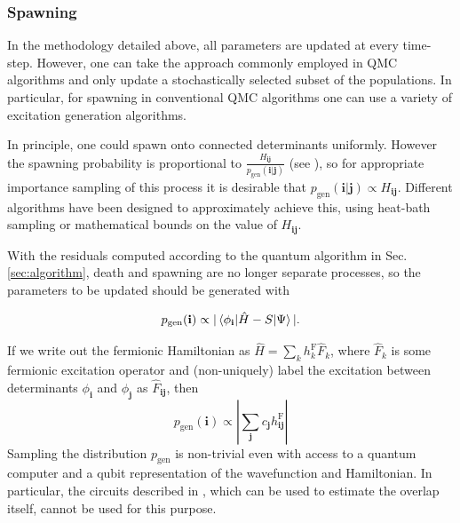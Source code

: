 \documentclass[%
 reprint,
 amsmath,amssymb,
 aps,
]{revtex4-2}
\begin{document}
{\subsubsection{Spawning}\label{sec:spawn}
In the methodology detailed above, all parameters are updated at every time-step. However, one can take the approach commonly employed in QMC algorithms and only update a stochastically selected subset of the populations. In particular, for spawning in conventional QMC algorithms one can use a variety of excitation generation algorithms.\cite{Holmes2016,Neufeld2019,Gunther2020,Weser2023} 

In principle, one could spawn onto connected determinants uniformly. However the spawning probability is proportional to $\frac{H_\mathbf{ij}}{p_\mathrm{gen}(\mathbf{i|j}) }$ (see ), so for appropriate importance sampling of this process it is desirable that ${p_\mathrm{gen}(\mathbf{i|j}) } \propto {H_\mathbf{ij}}$. Different algorithms have been designed to approximately achieve this, using heat-bath sampling\cite{Holmes2016,Weser2023} or mathematical bounds on the value of ${H_\mathbf{ij}}$.\cite{Neufeld2019}

With the residuals computed according to the quantum algorithm in Sec. \ref{sec:algorithm}, death and spawning are no longer separate processes, so the parameters to be updated should be generated with 
{ 
\begin{equation}
{p_\mathrm{gen}(\mathbf i) } \propto |\braket{\phi_\mathbf{i}|\hat H - S |\Psi}|.
\end{equation}

{ If we write out the fermionic Hamiltonian as
${\hat H = \sum_k h^\mathrm{F}_k \hat F_k}$, where $\hat F_k$ is some fermionic excitation operator and (non-uniquely) label the excitation between determinants $\phi_\mathbf{i}$ and $\phi_\mathbf{j}$ as $\hat F_\mathbf{ij}$, then 
\begin{equation}
    {p_\mathrm{gen}(\mathbf i) } \propto |\sum_\mathbf{j} c_\mathbf{j}h^\mathrm{F}_\mathbf{ij}|
    \label{eq:prob1}
\end{equation}
Sampling the distribution $p_\mathrm{gen}$ is non-trivial even with access to a quantum computer and a qubit representation of the wavefunction and Hamiltonian.} In particular, the circuits described in , which can be used to estimate the overlap itself, cannot be used for this purpose. 

}}
\end{document}
